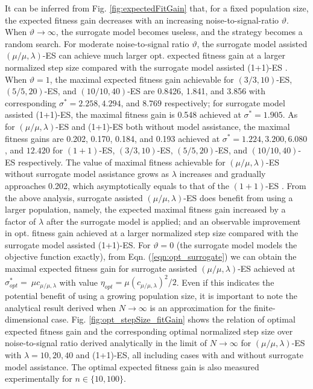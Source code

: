 
It can be inferred from Fig. \ref{fig:expectedFitGain} that, for a fixed population size, the expected fitness gain decreases with an increasing noise-to-signal-ratio $\vartheta$. When $\vartheta \rightarrow \infty$, the surrogate model becomes useless, and the strategy becomes a random search. For moderate noise-to-signal ratio $\vartheta$, the surrogate model assisted $(\mu/\mu,\lambda)$-ES can achieve much larger opt. expected fitness gain at a larger normalized step size compared with the surrogate model assisted (1+1)-ES \cite{DBLP:conf/ppsn/KayhaniA18}. When $\vartheta = 1$, the maximal expected fitness gain achievable for $(3/3,10)$-ES, $(5/5,20)$-ES, and $(10/10,40)$-ES are 0.8426, 1.841, and 3.856 with corresponding $\sigma^*=2.258,4.294$, and $8.769$ respectively; for surrogate model assisted (1+1)-ES, the maximal fitness gain is 0.548 achieved at $\sigma^* = 1.905$. As for $(\mu/\mu,\lambda)$-ES and (1+1)-ES both without model assistance, the maximal fitness gains are 0.202, 0.170, 0.184, and 0.193 achieved at $\sigma^*=1.224,3.200,6.080$, and $12.420$ for $(1+1)$-ES, $(3/3,10)$-ES, $(5/5,20)$-ES, and $(10/10,40)$-ES respectively. The value of maximal fitness achievable for $(\mu/\mu,\lambda)$-ES without surrogate model assistance grows as $\lambda$ increases and gradually approaches 0.202, which asymptotically equals to that of the $(1+1)$-ES \cite{Beyer:1995:TTE:1326683.1326688}. From the above analysis, surrogate assisted $(\mu/\mu,\lambda)$-ES does benefit from using a larger population, namely, the expected maximal fitness gain increased by a factor of $\lambda$ after the surrogate model is applied; and an observable improvement in opt. fitness gain achieved at a larger normalized step size compared with the surrogate model assisted (1+1)-ES. For $\vartheta=0$ (the surrogate model models the objective function exactly), from Eqn. (\ref{eqn:opt_surrogate}) we can obtain the maximal expected fitness gain for surrogate assisted $(\mu/\mu,\lambda)$-ES achieved at $\sigma^*_{opt} = \ \mu c_{\mu / \mu, \lambda}$ with value $\eta_{opt} =  \mu (c_{\mu / \mu, \lambda})^2/2$. Even if this indicates the potential benefit of using a growing population size, it is important to note the analytical result derived when $N \rightarrow \infty$ is an approximation for the finite-dimensional case. Fig. \ref{fig:opt_stepSize_fitGain} shows the relation of optimal expected fitness gain and the corresponding optimal normalized step size over noise-to-signal ratio derived analytically in the limit of $N \rightarrow \infty$ for $(\mu/\mu,\lambda)$-ES with $\lambda=10,20,40$ and (1+1)-ES, all including cases with and without surrogate model assistance. The optimal expected fitness gain is also measured experimentally for $n \in \{10,100 \}$. 
   
